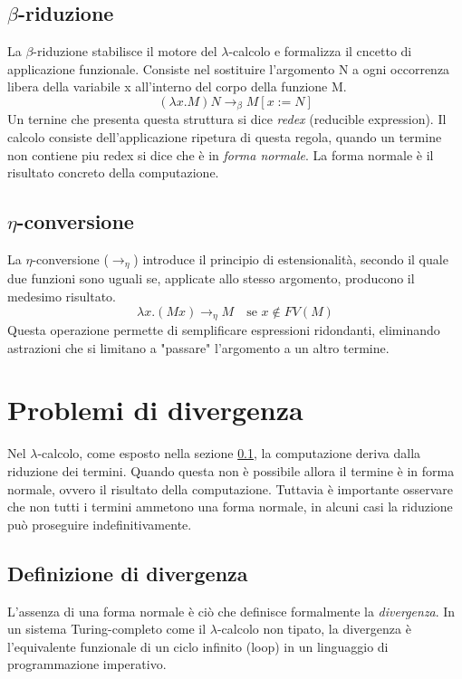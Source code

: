 \subsection{\texorpdfstring{$\beta$}{beta}-riduzione}
\label{sec:beta_reduction}
La $\beta$-riduzione stabilisce il motore del $\lambda$-calcolo e formalizza il cncetto di applicazione funzionale. Consiste nel sostituire l'argomento N a ogni
occorrenza libera della variabile x all'interno del corpo della funzione M.
\begin{equation}
    (\lambda x. M) N \to_\beta M[x := N]
    \label{eq:beta_reduction}
\end{equation}
Un ternine che presenta questa struttura si dice \emph{redex} (reducible expression). Il calcolo consiste dell'applicazione ripetura di questa regola, 
quando un termine non contiene piu redex si dice che è in \emph{forma normale}. La forma normale è il risultato concreto della computazione.

\subsection{\texorpdfstring{$\eta$}{eta}-conversione}
La $\eta$-conversione ($\to_\eta$) introduce il principio di estensionalità, secondo il quale due funzioni sono uguali se, 
applicate allo stesso argomento, producono il medesimo risultato.
\begin{equation}
    \lambda x. (M x) \to_\eta M \quad \text{se } x \notin FV(M)
    \label{eq:eta_conversion}
\end{equation}
Questa operazione permette di semplificare espressioni ridondanti, eliminando astrazioni che si limitano a "passare" 
l'argomento a un altro termine.

\section{Problemi di divergenza}
Nel $\lambda$-calcolo, come esposto nella sezione \ref{sec:beta_reduction}, la computazione deriva dalla riduzione dei termini. Quando questa non è possibile allora
il termine è in forma normale, ovvero il risultato della computazione. Tuttavia è importante osservare che non tutti i termini ammetono una forma normale, in alcuni 
casi la riduzione può proseguire indefinitivamente. 

\subsection{Definizione di divergenza}
L'assenza di una forma normale è ciò che definisce formalmente la \emph{divergenza}. 
In un sistema Turing-completo come il $\lambda$-calcolo non tipato, la divergenza è 
l'equivalente funzionale di un ciclo infinito (loop) in un linguaggio di programmazione imperativo.

